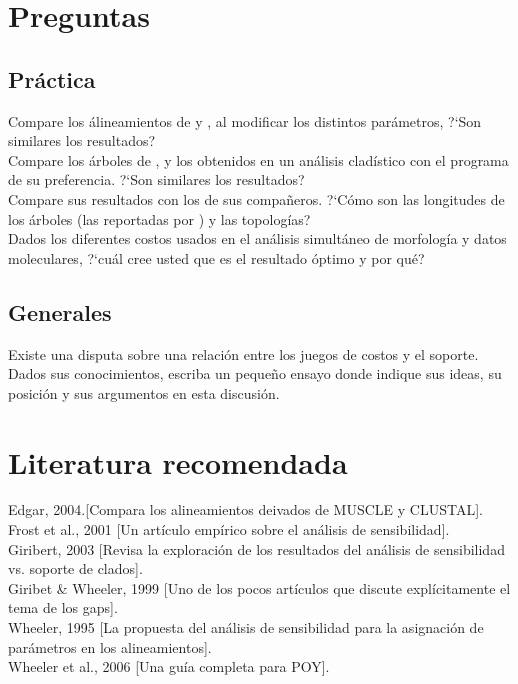\section{Preguntas}
\subsection{Pr\'actica}
\noindent
Compare los \'alineamientos de  y , al modificar los distintos par\'ametros, ?`Son similares los resultados?\\
Compare los \'arboles de ,  y los obtenidos en un an\'alisis clad\'istico con el programa de su  preferencia. ?`Son similares los resultados?\\
Compare sus resultados con los de sus compa\~neros. ?`C\'omo son las longitudes de los \'arboles (las reportadas por ) y las topolog\'ias?\\
Dados los diferentes costos usados en el an\'alisis simult\'aneo de morfolog\'ia y datos moleculares, 
 ?`cu\'al cree usted que es el resultado \'optimo y por qu\'e?
\subsection{Generales}
\noindent
Existe una disputa sobre una relaci\'on entre los juegos de costos y el soporte. Dados sus conocimientos, escriba un 
peque\~no ensayo donde indique sus ideas, su posici\'on y sus argumentos en esta discusi\'on.
\section{Literatura recomendada}
\noindent
Edgar, 2004.[Compara los alineamientos deivados de MUSCLE y CLUSTAL].\\
Frost et al., 2001 [Un art\'iculo emp\'irico sobre el an\'alisis de sensibilidad].\\
Giribert, 2003 [Revisa la exploraci\'on de los resultados del an\'alisis de sensibilidad vs. soporte de clados].\\
Giribet \& Wheeler, 1999 [Uno de los pocos art\'iculos que discute expl\'icitamente el tema de los gaps].\\
Wheeler, 1995 [La propuesta del an\'alisis de sensibilidad para la asignaci\'on de par\'ametros en los alineamientos].\\
Wheeler et al., 2006 [Una gu\'ia completa para POY].
